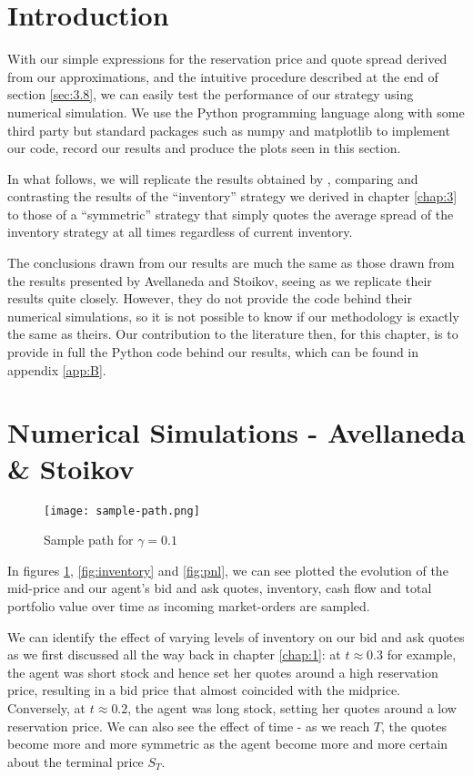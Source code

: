 \section{Introduction}

With our simple expressions for the reservation price and quote
spread derived from our approximations, and the intuitive procedure
described at the end of section \ref{sec:3.8}, we can easily test 
the performance of our strategy using numerical simulation. We use the Python 
programming language along with some third party but standard packages such as 
numpy and matplotlib to implement our code, record our results and produce the 
plots seen in this section. 

In what follows, we will replicate the results obtained 
by \cite{AS2008}, comparing and contrasting the results of the ``inventory'' strategy
we derived in chapter \ref{chap:3} to those of a ``symmetric'' strategy that simply
quotes the average spread of the inventory strategy at all times regardless of current
inventory. 

The conclusions drawn from our results are much the same as those drawn 
from the results presented by Avellaneda and Stoikov, seeing as we replicate their 
results quite closely. However, they do not provide the code behind their numerical 
simulations, so it is not possible to know if our methodology is exactly the same as 
theirs. Our contribution to the literature then, for this chapter, is to provide in 
full the Python code behind our results, which can be found in appendix \ref{app:B}.

\section{Numerical Simulations - Avellaneda \& Stoikov}

\begin{figure}[ht!]
    \centering
        \texttt{[image: sample-path.png]}
        \caption{Sample path for $\gamma=0.1$}
        \label{fig:sample-paths}
\end{figure}

In figures \ref{fig:sample-paths}, \ref{fig:inventory} and \ref{fig:pnl}, we can see 
plotted the evolution of the mid-price and our agent's bid and ask quotes, inventory,
cash flow and total portfolio value over time as incoming market-orders are sampled.

We can identify the effect of varying levels of inventory on our bid 
and ask quotes as we first discussed all the way back in chapter \ref{chap:1}: at 
$t\approx0.3$ for example, the agent was short stock and hence set her quotes around 
a high reservation price, resulting in a bid price that almost coincided with the 
midprice. Conversely, at $t\approx0.2$, the agent was long stock, setting her quotes 
around a low reservation price. We can also see the effect of time - as we reach $T$, 
the quotes become more and more symmetric as the agent become more and more certain 
about the terminal price $S_T$.

